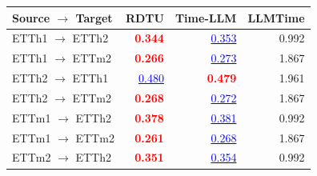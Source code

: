 \documentclass[10pt]{article}
\newcommand{\boldres}[1]{{\textbf{\textcolor{red}{#1}}}}
\newcommand{\secondres}[1]{{\underline{\textcolor{blue}{#1}}}}
\begin{document}
\begin{minipage}{7.1in}
\begin{minipage}[t]{0.48\textwidth}
\centering
\begin{tabular*}{\linewidth}{@{\extracolsep{\fill}}lrrr@{}}
\toprule
\textbf{Source $\to$ Target}
  & \textbf{RDTU}
  & \textbf{Time-LLM}
  & \textbf{LLMTime} \\
\midrule
ETTh1 $\to$ ETTh2
  & \boldres{0.344} & \secondres{0.353} & 0.992 \\
ETTh1 $\to$ ETTm2
  & \boldres{0.266} & \secondres{0.273} & 1.867 \\
ETTh2 $\to$ ETTh1
  & \secondres{0.480} & \boldres{0.479} & 1.961 \\
ETTh2 $\to$ ETTm2
  & \boldres{0.268} & \secondres{0.272} & 1.867 \\
\addlinespace[2pt]
ETTm1 $\to$ ETTh2
  & \boldres{0.378} & \secondres{0.381} & 0.992 \\
ETTm1 $\to$ ETTm2
  & \boldres{0.261} & \secondres{0.268} & 1.867 \\
ETTm2 $\to$ ETTh2
  & \boldres{0.351} & \secondres{0.354} & 0.992 \\
\bottomrule
\end{tabular*}
\end{minipage}

\endgroup

\vspace{-12pt}

\end{minipage}\par\endgroup

\clearpage\begingroup

\setcounter{table}{2}
\end{document}
